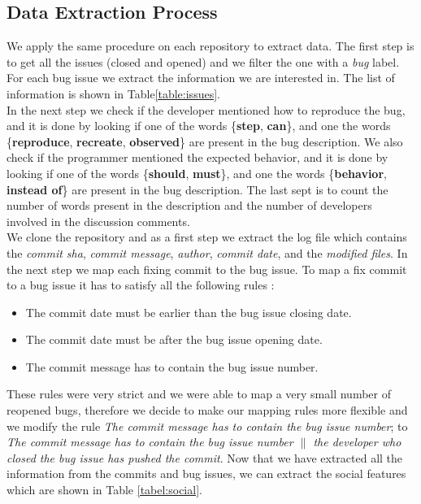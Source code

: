 \documentclass[sigconf,review]{acmart}
\begin{document}
\subsection{Data Extraction Process}
 We apply the same procedure on each repository to extract data. The first step is to get all the issues (closed and opened) and we filter the one with a \emph{bug} label.
 For each bug issue we extract the information we are interested in. The list of information is shown in Table\ref{table:issues}. \\In the next step we check if the developer mentioned how to reproduce the bug, and it is done by looking if one of the words \{\textbf{step},  \textbf{can}\}, and one the words  \{\textbf{reproduce}, \textbf{recreate}, \textbf{observed}\}  are present in the bug description. We also check if the programmer mentioned the expected behavior, and it is done by looking if one of the words \{\textbf{should},  \textbf{must}\}, and one the  words  \{\textbf{behavior}, \textbf{instead of}\} are present in the bug description. The last sept is to count the number of words present in the description and the number of developers involved in the discussion comments.\\
 We clone the repository and as a first step we extract the log file which contains the \emph{commit sha}, \emph{commit message}, \emph{author}, \emph{commit date}, and the \emph{modified files}. In the next step we map each fixing commit to the bug issue. To map a fix commit to a bug issue it has to satisfy all the following rules :
  \begin{itemize}
 	\item The commit date must be earlier than the bug issue closing date.
 	\item The commit date must be after the bug issue opening date.
 	\item The commit message has to contain the bug issue number.
 	\end{itemize}
These rules were very strict and we were able to map a very small number of reopened bugs, therefore we decide to make our mapping rules more flexible and we modify the rule \emph{The commit message has to contain the bug issue number}; to \emph{The commit message has to contain the bug issue number $\parallel$ the developer who closed the bug issue has pushed the commit}. Now that we have extracted all the information from the commits and bug issues, we can extract the social features which are shown in Table \ref{tabel:social}.\\ 
\end{document}

